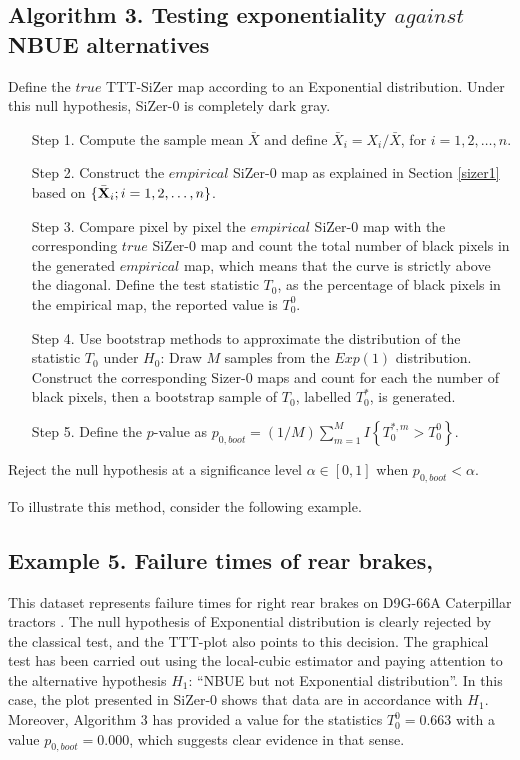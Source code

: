 \documentclass[preprint,12pt]{elsarticle}
\begin{document}
\subsection*{Algorithm 3. Testing exponentiality $against$ NBUE alternatives} 
Define the $true$ TTT-SiZer map according to an Exponential distribution. Under this null hypothesis, SiZer-0 is completely dark gray. 
\begin{enumerate}
\item[Step 1.] Compute the sample mean $\bar{X}$ and define $\bar{X}_i=X_i/\bar{X}$, for $ i=1,2,\ldots,n$.
\item[Step 2.] Construct the  $empirical$ SiZer-$0$ map as explained in Section \ref{sizer1} based on  $\{\bar{\bf X}_i; i=1, 2,\ldots, n \}$.
\item[Step 3.] Compare pixel by pixel the $empirical$ SiZer-$0$ map with the corresponding $true$ SiZer-$0$ map and count the total number of black pixels in the generated $empirical$ map, which means that the curve is strictly above the diagonal. Define the test statistic $T_0$, as the percentage of black pixels in the empirical map, the reported value is $T_0^0$.

\item[Step 4.] Use bootstrap methods to approximate the distribution of the statistic $T_0$ under $H_0$: Draw $M$ samples from the $Exp(1)$ distribution. Construct the corresponding Sizer-$0$ maps and count for each the number of black pixels, then a bootstrap sample of $T_0$, labelled $T^*_0$, is generated.

\item[Step 5.] Define the $p$-value as $p_{0,boot}=(1/M)\sum_{m=1}^M I\left\{T^{*,m}_0 > T_0^0\right\}$.
\end{enumerate}
Reject the null hypothesis at a significance level $\alpha \in [0,1]$ when $p_{0,boot} < \alpha$. %

To illustrate this method, consider the following example. 
\subsection*{Example 5. Failure times of rear brakes, \cite{BC75}}
This dataset represents failure times for right rear brakes on D9G-66A Caterpillar tractors \cite{BC75}. The null hypothesis of Exponential distribution is clearly rejected by the classical test, and the TTT-plot also points to this decision. The graphical test has been carried out using the local-cubic estimator and paying attention to the alternative hypothesis $H_1$: ``NBUE but not Exponential distribution''. In this case, the plot presented in SiZer-0 shows that data are in accordance with $H_1$. Moreover, Algorithm 3 has provided a value for the statistics $T_0^0=0.663$ with a value $p_{0,boot}=0.000$, which suggests clear evidence in that sense. 
\end{document}
